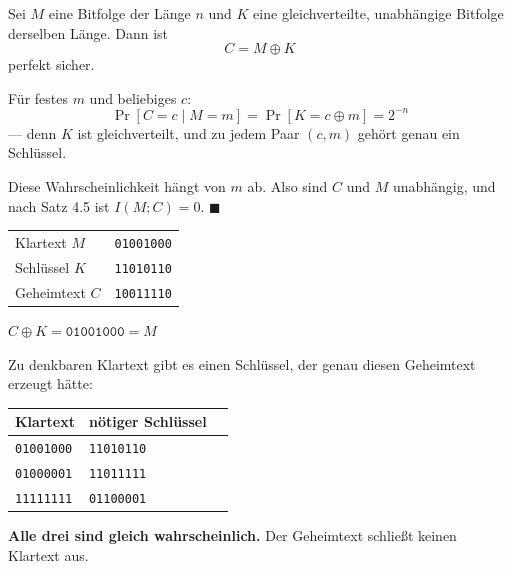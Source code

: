 \begin{merksatz}
Sei $M$ eine Bitfolge der Länge $n$ und $K$ eine gleichverteilte, unabhängige Bitfolge derselben Länge. Dann ist
\[ C = M \oplus K \]
perfekt sicher.

Für festes $m$ und beliebiges $c$:
\[ \Pr[C=c\mid M=m] = \Pr[K = c\oplus m] = 2^{-n} \]
--- denn $K$ ist gleichverteilt, und zu jedem Paar $(c,m)$ gehört genau ein Schlüssel.

Diese Wahrscheinlichkeit hängt  von $m$ ab. Also sind $C$ und $M$ unabhängig, und nach Satz 4.5 ist $I(M;C) = 0$. $\blacksquare$

\begin{center}
{\small
\renewcommand{\arraystretch}{1.5}
\begin{tabular}{@{}P{2.6cm}P{2.8cm}@{}}
\toprule
Klartext $M$ & \texttt{01001000}\\
Schlüssel $K$ & \texttt{11010110}\\
\midrule
Geheimtext $C$ & \texttt{10011110}\\
\bottomrule
\end{tabular}}
\end{center}

 $C \oplus K = \texttt{01001000} = M$ \checkmark

Zu  denkbaren Klartext gibt es einen Schlüssel, der genau diesen Geheimtext erzeugt hätte:

\begin{center}
\renewcommand{\arraystretch}{1.48}
\begin{tabular}{@{}P{2.4cm}P{2.4cm}P{2.4cm}@{}}
\toprule
\textbf{Klartext} & \textbf{nötiger Schlüssel} & \\
\midrule
\texttt{01001000} & \texttt{11010110} & \\
\texttt{01000001} & \texttt{11011111} & \\
\texttt{11111111} & \texttt{01100001} & \\
\bottomrule
\end{tabular}
\end{center}

\begin{center}
\begin{minipage}{0.9\textwidth}
\textbf{Alle drei sind gleich wahrscheinlich.} Der Geheimtext schließt keinen Klartext aus.
\end{minipage}
\end{center}
\end{merksatz}

